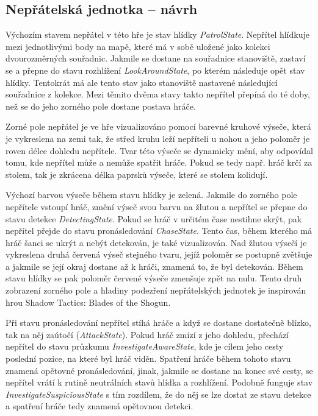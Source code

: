 \documentclass[FM,Proj,bw]{tulthesis}
\begin{document}
	\subsection{Nepřátelská jednotka – návrh}
	
	Výchozím stavem nepřátel v této hře je stav hlídky \textit{PatrolState}. Nepřítel hlídkuje mezi jednotlivými body na mapě, které má v sobě uložené jako kolekci dvourozměrných souřadnic. Jakmile se dostane na souřadnice stanoviště, zastaví se a přepne do stavu rozhlížení \textit{LookAroundState}, po kterém následuje opět stav hlídky. Tentokrát má ale tento stav jako stanoviště nastavené následující souřadnice z kolekce. Mezi těmito dvěma stavy takto nepřítel přepíná do té doby, než se do jeho zorného pole dostane postava hráče.
	
	Zorné pole nepřátel je ve hře vizualizováno pomocí barevné kruhové výseče, která je vykreslena na zemi tak, že střed kruhu leží nepříteli u nohou a jeho poloměr je roven délce dohledu nepřítele. Tvar této výseče se dynamicky mění, aby odpovídal tomu, kde nepřítel může a nemůže spatřit hráče. Pokud se tedy např. hráč krčí za stolem, tak je zkrácena délka paprsků výseče, které se stolem kolidují.
	
	Výchozí barvou výseče během stavu hlídky je zelená. Jakmile do zorného pole nepřítele vstoupí hráč, změní výseč svou barvu na žlutou a nepřítel se přepne do stavu detekce \textit{DetectingState}. Pokud se hráč v určitém čase nestihne skrýt, pak nepřítel přejde do stavu pronásledování \textit{ChaseState}. Tento čas, během kterého má hráč šanci se ukrýt a nebýt detekován, je také vizualizován. Nad žlutou výsečí je vykreslena druhá červená výseč stejného tvaru, jejíž poloměr se postupně zvětšuje a jakmile se její okraj dostane až k hráči, znamená to, že byl detekován. Během stavu hlídky se pak poloměr červené výseče zmenšuje zpět na nulu. Tento druh zobrazení zorného pole a hladiny podezření nepřátelských jednotek je inspirován hrou Shadow Tactics: Blades of the Shogun.
	
	Při stavu pronásledování nepřítel stíhá hráče a když se dostane dostatečně blízko, tak na něj zaútočí (\textit{AttackState}). Pokud hráč zmizí z jeho dohledu, přechází nepřítel do stavu průzkumu \textit{InvestigateAwareState}, kde je cílem jeho cesty poslední pozice, na které byl hráč viděn. Spatření hráče během tohoto stavu znamená opětovné pronásledování, jinak, jakmile se dostane na konec své cesty, se nepřítel vrátí k rutině neutrálních stavů hlídka a rozhlížení. Podobně funguje stav \textit{InvestigateSuspiciousState} s tím rozdílem, že do něj se lze dostat ze stavu detekce a spatření hráče tedy znamená opětovnou detekci.
	
\end{document}
